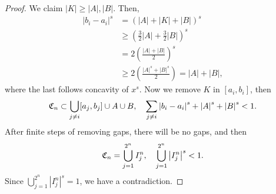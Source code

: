 \begin{proof}
We claim $\left|K\right| \geq \left|A\right|, \left|B\right|$. Then,
\begin{align*}
    \left|b_i - a_i\right|^s & = \left(\left|A\right| + \left|K\right| + \left|B\right|\right)^s \\
    & \geq \left(\frac{3}{2}\left|A\right| + \frac{3}{2}\left|B\right|\right)^s \\
    & = 2 \left(\frac{\left|A\right| + \left|B\right|}{2}\right)^s \\
    & \geq 2 \left(\frac{\left|A\right|^s + \left|B\right|^s}{2}\right) = \left|A\right| + \left|B\right|,
\end{align*}
where the last follows concavity of $x^s$. Now we remove $K$ in $[a_i,b_i]$, then
\begin{align*}
    \mathfrak{C}_n \subset \bigcup_{j\neq i} [a_j,b_j] \cup A \cup B,\quad \sum_{j\neq i} \left|b_i - a_i\right|^s + \left|A\right|^s + \left|B\right|^s < 1.
\end{align*}
After finite steps of removing gaps, there will be no gaps, and then
\begin{align*}
    \mathfrak{C}_n = \bigcup^{2^n}_{j=1} I^n_j, \quad \bigcup^{2^n}_{j=1} \left|I^n_j\right|^s < 1.
\end{align*}
Since $\bigcup^{2^n}_{j=1} \left|I^n_j\right|^s = 1$, we have a contradiction.
\end{proof}